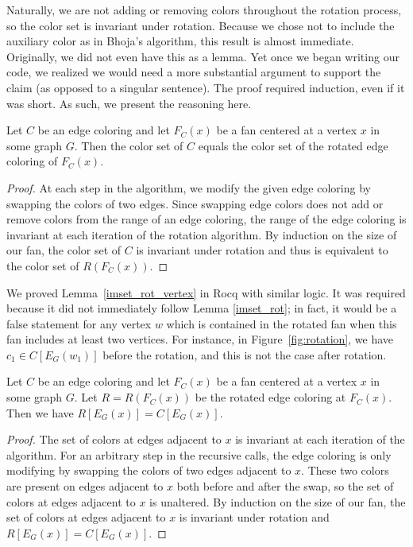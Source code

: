 Naturally, we are not adding or removing colors throughout the rotation process, so the color set is invariant under rotation. Because we chose not to include the auxiliary color as in Bhoja's algorithm, this result is almost immediate. Originally, we did not even have this as a lemma. Yet once we began writing our code, we realized we would need a more substantial argument to support the claim (as opposed to a singular sentence). The proof required induction, even if it was short. As such, we present the reasoning here.
\begin{lemma}\label{imset_rot}
   Let $C$ be an edge coloring and let $F_C(x)$ be a fan centered at a vertex $x$ in some graph $G.$ Then the color set of $C$ equals the color set of the rotated edge coloring of $F_C(x).$
\end{lemma}
\begin{proof}
    At each step in the  algorithm, we modify the given edge coloring by swapping the colors of two edges. Since swapping edge colors does not add or remove colors from the range of an edge coloring, the range of the edge coloring is invariant at each iteration of the rotation algorithm. By induction on the size of our fan, the color set of $C$ is invariant under rotation and thus is equivalent to the color set of $R(F_C(x)).$
\end{proof}

We proved Lemma~\ref{imset_rot_vertex} in Rocq with similar logic. It was required because it did not immediately follow Lemma \ref{imset_rot}; in fact, it would be a false statement for any vertex $w$ which is contained in the rotated fan when this fan includes at least two vertices. For instance, in Figure~\ref{fig:rotation}, we have $c_1 \in C[E_G(w_1)]$ before the rotation, and this is not the case after rotation.
\begin{lemma}\label{imset_rot_vertex}
     Let $C$ be an edge coloring and let $F_C(x)$ be a fan centered at a vertex $x$ in some graph $G.$ Let $R = R(F_C(x))$ be the rotated edge coloring at $F_C(x)$. Then we have $R[E_G(x)] = C[E_G(x)]$.
\end{lemma}
\begin{proof}
    The set of colors at edges adjacent to $x$ is invariant at each iteration of the  algorithm. For an arbitrary step in the recursive calls, the edge coloring is only modifying by swapping the colors of two edges adjacent to $x$. These two colors are present on edges adjacent to $x$ both before and after the swap, so the set of colors at edges adjacent to $x$ is unaltered. By induction on the size of our fan, the set of colors at edges adjacent to $x$ is invariant under rotation and $R[E_G(x)] = C[E_G(x)]$.
\end{proof}


